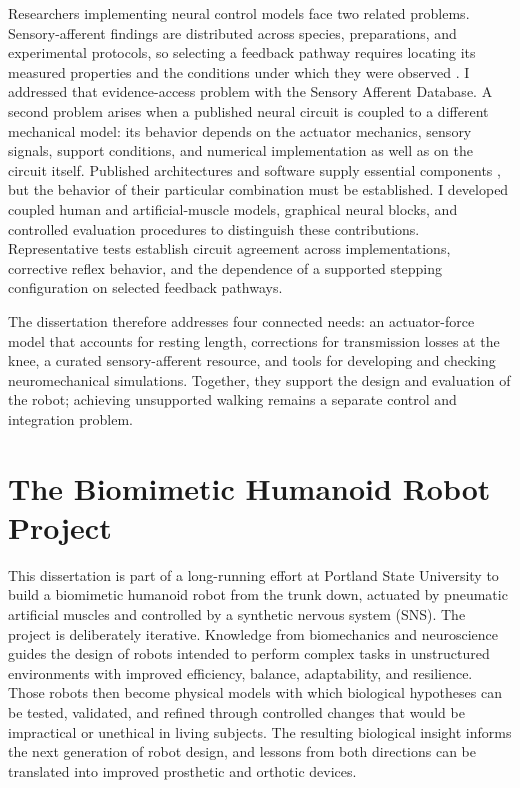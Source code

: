 Researchers implementing neural control models face two related problems. Sensory-afferent findings are distributed across species, preparations, and experimental protocols, so selecting a feedback pathway requires locating its measured properties and the conditions under which they were observed \citep{van_de_crommert_review_1998, windhorst_muscle_2007, windhorst_spinal_2022}. I addressed that evidence-access problem with the Sensory Afferent Database. A second problem arises when a published neural circuit is coupled to a different mechanical model: its behavior depends on the actuator mechanics, sensory signals, support conditions, and numerical implementation as well as on the circuit itself. Published architectures and software supply essential components \citep{rybak_modelling_2006, mccrea_organization_2008, markin_afferent_2010, nourse_sns_2023}, but the behavior of their particular combination must be established. I developed coupled human and artificial-muscle models, graphical neural blocks, and controlled evaluation procedures to distinguish these contributions. Representative tests establish circuit agreement across implementations, corrective reflex behavior, and the dependence of a supported stepping configuration on selected feedback pathways.

The dissertation therefore addresses four connected needs: an actuator-force model that accounts for resting length, corrections for transmission losses at the knee, a curated sensory-afferent resource, and tools for developing and checking neuromechanical simulations. Together, they support the design and evaluation of the robot; achieving unsupported walking remains a separate control and integration problem.

\section{The Biomimetic Humanoid Robot Project}\label{sec:project}

This dissertation is part of a long-running effort at Portland State University to build a biomimetic humanoid robot from the trunk down, actuated by pneumatic artificial muscles and controlled by a synthetic nervous system (SNS). The project is deliberately iterative. Knowledge from biomechanics and neuroscience guides the design of robots intended to perform complex tasks in unstructured environments with improved efficiency, balance, adaptability, and resilience. Those robots then become physical models with which biological hypotheses can be tested, validated, and refined through controlled changes that would be impractical or unethical in living subjects. The resulting biological insight informs the next generation of robot design, and lessons from both directions can be translated into improved prosthetic and orthotic devices.

